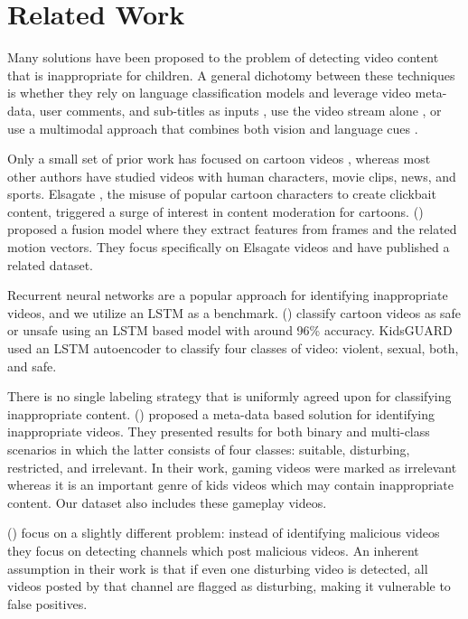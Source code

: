 \documentclass[letterpaper]{article}
\begin{document}
\section{Related Work}\label{RW}
Many solutions have been proposed to the problem of detecting video content that is inappropriate for children. A general dichotomy between these techniques is whether they rely on language classification models and leverage video meta-data, user comments, and sub-titles as inputs \cite{1,6,7},  use the video stream alone \cite{3,9,11}, or use a multimodal approach that  combines both vision and language cues \cite{2,5,8,10}.

Only a small set of prior work has focused on cartoon videos \cite{2,10,11}, whereas most other authors have  studied videos with human characters, movie clips, news, and sports.  Elsagate \cite{elsa}, the misuse of popular cartoon characters to create clickbait content, triggered a surge of interest in content moderation for cartoons.
\citeauthor{11} (\citeyear{11}) proposed a fusion model where they extract features from frames and the related motion vectors. They focus specifically on Elsagate videos and have published a related dataset.

Recurrent neural networks are a popular approach for identifying inappropriate videos, and we utilize an LSTM as a benchmark. \citeauthor{3} (\citeyear{3}) classify cartoon videos as safe or unsafe using an LSTM based model with around 96\% accuracy.  KidsGUARD \cite{9} used an LSTM autoencoder to classify four classes of video:  violent, sexual, both, and safe.  

There is no single labeling strategy that is uniformly agreed upon for classifying inappropriate content.  
\citeauthor{6} (\citeyear{6}) proposed a meta-data based solution for identifying inappropriate videos. They presented results for both binary and multi-class scenarios in which the latter consists of four classes: suitable, disturbing, restricted, and irrelevant. In their work, gaming videos were marked as irrelevant whereas it is an important genre of kids videos which may contain inappropriate content.  Our dataset also includes these gameplay videos.

\citeauthor{1} (\citeyear{1}) focus on a slightly different problem: instead of identifying malicious videos they focus on detecting channels which post malicious videos.  An inherent assumption in their work is that if even one disturbing video is detected, all videos posted by that channel are flagged as disturbing, making it vulnerable to false positives. 
\end{document}
